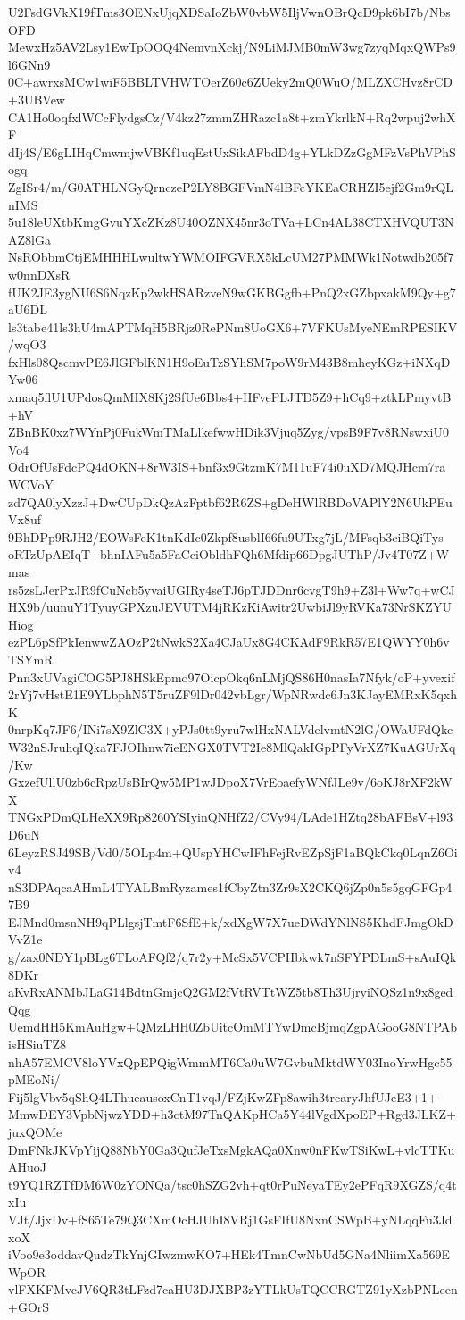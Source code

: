 U2FsdGVkX19fTms3OENxUjqXDSaIoZbW0vbW5IljVwnOBrQcD9pk6bI7b/NbsOFD
MewxHz5AV2Lsy1EwTpOOQ4NemvnXckj/N9LiMJMB0mW3wg7zyqMqxQWPs9l6GNn9
0C+awrxsMCw1wiF5BBLTVHWTOerZ60c6ZUeky2mQ0WuO/MLZXCHvz8rCD+3UBVew
CA1Ho0oqfxlWCcFlydgsCz/V4kz27zmmZHRazc1a8t+zmYkrlkN+Rq2wpuj2whXF
dIj4S/E6gLIHqCmwmjwVBKf1uqEstUxSikAFbdD4g+YLkDZzGgMFzVsPhVPhSogq
ZgISr4/m/G0ATHLNGyQrnczeP2LY8BGFVmN4lBFcYKEaCRHZI5ejf2Gm9rQLnIMS
5u18leUXtbKmgGvuYXcZKz8U40OZNX45nr3oTVa+LCn4AL38CTXHVQUT3NAZ8lGa
NsRObbmCtjEMHHHLwultwYWMOIFGVRX5kLcUM27PMMWk1Notwdb205f7w0nnDXsR
fUK2JE3ygNU6S6NqzKp2wkHSARzveN9wGKBGgfb+PnQ2xGZbpxakM9Qy+g7aU6DL
ls3tabe41ls3hU4mAPTMqH5BRjz0RePNm8UoGX6+7VFKUsMyeNEmRPESIKV/wqO3
fxHls08QscmvPE6JlGFblKN1H9oEuTzSYhSM7poW9rM43B8mheyKGz+iNXqDYw06
xmaq5flU1UPdosQmMIX8Kj2SfUe6Bbs4+HFvePLJTD5Z9+hCq9+ztkLPmyvtB+hV
ZBnBK0xz7WYnPj0FukWmTMaLlkefwwHDik3Vjuq5Zyg/vpsB9F7v8RNswxiU0Vo4
OdrOfUsFdcPQ4dOKN+8rW3IS+bnf3x9GtzmK7M11uF74i0uXD7MQJHcm7raWCVoY
zd7QA0lyXzzJ+DwCUpDkQzAzFptbf62R6ZS+gDeHWlRBDoVAPlY2N6UkPEuVx8uf
9BhDPp9RJH2/EOWsFeK1tnKdIc0Zkpf8usblI66fu9UTxg7jL/MFsqb3ciBQiTys
oRTzUpAEIqT+bhnIAFu5a5FaCciObldhFQh6Mfdip66DpgJUThP/Jv4T07Z+Wmas
rs5zsLJerPxJR9fCuNcb5yvaiUGIRy4seTJ6pTJDDnr6cvgT9h9+Z3l+Ww7q+wCJ
HX9b/uunuY1TyuyGPXzuJEVUTM4jRKzKiAwitr2UwbiJl9yRVKa73NrSKZYUHiog
ezPL6pSfPkIenwwZAOzP2tNwkS2Xa4CJaUx8G4CKAdF9RkR57E1QWYY0h6vTSYmR
Pnn3xUVagiCOG5PJ8HSkEpmo97OicpOkq6nLMjQS86H0nasIa7Nfyk/oP+yvexif
2rYj7vHstE1E9YLbphN5T5ruZF9lDr042vbLgr/WpNRwdc6Jn3KJayEMRxK5qxhK
0nrpKq7JF6/INi7sX9ZlC3X+yPJs0tt9yru7wlHxNALVdelvmtN2lG/OWaUFdQkc
W32nSJruhqIQka7FJOIhnw7ieENGX0TVT2Ie8MlQakIGpPFyVrXZ7KuAGUrXq/Kw
GxzefUllU0zb6cRpzUsBIrQw5MP1wJDpoX7VrEoaefyWNfJLe9v/6oKJ8rXF2kWX
TNGxPDmQLHeXX9Rp8260YSIyinQNHfZ2/CVy94/LAde1HZtq28bAFBsV+l93D6uN
6LeyzRSJ49SB/Vd0/5OLp4m+QUspYHCwIFhFejRvEZpSjF1aBQkCkq0LqnZ6Oiv4
nS3DPAqcaAHmL4TYALBmRyzames1fCbyZtn3Zr9sX2CKQ6jZp0n5s5gqGFGp47B9
EJMnd0msnNH9qPLlgsjTmtF6SfE+k/xdXgW7X7ueDWdYNlNS5KhdFJmgOkDVvZ1e
g/zax0NDY1pBLg6TLoAFQf2/q7r2y+McSx5VCPHbkwk7nSFYPDLmS+sAuIQk8DKr
aKvRxANMbJLaG14BdtnGmjcQ2GM2fVtRVTtWZ5tb8Th3UjryiNQSz1n9x8gedQqg
UemdHH5KmAuHgw+QMzLHH0ZbUitcOmMTYwDmcBjmqZgpAGooG8NTPAbisHSiuTZ8
nhA57EMCV8loYVxQpEPQigWmmMT6Ca0uW7GvbuMktdWY03InoYrwHgc55pMEoNi/
Fij5lgVbv5qShQ4LThueausoxCnT1vqJ/FZjKwZFp8awih3trcaryJhfUJeE3+1+
MmwDEY3VpbNjwzYDD+h3ctM97TnQAKpHCa5Y44lVgdXpoEP+Rgd3JLKZ+juxQOMe
DmFNkJKVpYijQ88NbY0Ga3QufJeTxsMgkAQa0Xnw0nFKwTSiKwL+vlcTTKuAHuoJ
t9YQ1RZTfDM6W0zYONQa/tsc0hSZG2vh+qt0rPuNeyaTEy2ePFqR9XGZS/q4txIu
VJt/JjxDv+fS65Te79Q3CXmOcHJUhI8VRj1GsFIfU8NxnCSWpB+yNLqqFu3JdxoX
iVoo9e3oddavQudzTkYnjGIwzmwKO7+HEk4TmnCwNbUd5GNa4NliimXa569EWpOR
vlFXKFMvcJV6QR3tLFzd7caHU3DJXBP3zYTLkUsTQCCRGTZ91yXzbPNLeen+GOrS

